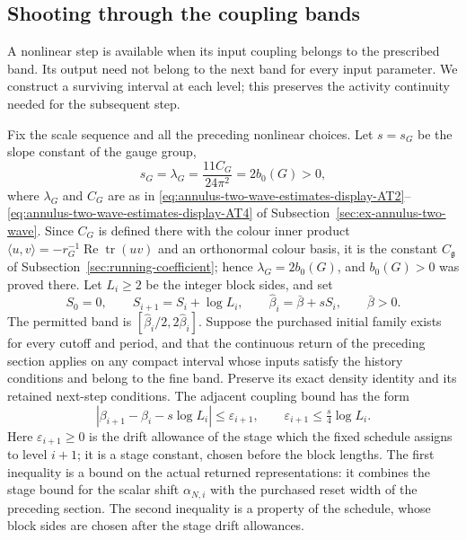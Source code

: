 \subsection{Shooting through the coupling bands}
\label{sec:surviving-interval-shooting}
A nonlinear step is available when its input coupling belongs to the
prescribed band. Its output need not belong to the next band for every
input parameter. We construct a surviving interval at each level; this
preserves the activity continuity needed for the subsequent step.

Fix the scale sequence and all the preceding nonlinear choices. Let
$s=s_G$ be the slope constant of the gauge group,
\begin{equation}\label{eq:shoot-slope}
 s_G=\lambda_G=\frac{11C_G}{24\pi^2}=2b_0(G)>0,
\end{equation}
where $\lambda_G$ and $C_G$ are as in \eqref{eq:annulus-two-wave-estimates-display-AT2}--\eqref{eq:annulus-two-wave-estimates-display-AT4} of
Subsection~\ref{sec:ex-annulus-two-wave}. Since $C_G$ is defined there with the
colour inner product $\langle u,v\rangle=-r_G^{-1}\operatorname{Re}\operatorname{tr}(uv)$
and an orthonormal colour basis, it is the constant $C_{\mathfrak g}$ of
Subsection~\ref{sec:running-coefficient}; hence $\lambda_G=2b_0(G)$, and
$b_0(G)>0$ was proved there. Let $L_i\ge2$ be the integer block sides, and set
\[
 S_0=0,\qquad S_{i+1}=S_i+\log L_i,\qquad
 \widehat\beta_i=\bar\beta+sS_i,\qquad \bar\beta>0.
\]
The permitted band is
$[\widehat\beta_i/2,2\widehat\beta_i]$.
Suppose the purchased initial family exists for every cutoff and period,
and that the continuous return of the preceding section applies on
any compact interval whose inputs satisfy the history conditions and
belong to the fine band. Preserve its exact density identity and its
retained next-step conditions. The adjacent coupling bound has the form
\begin{equation}\label{eq:shoot-adjacent-drift}
 |\beta_{i+1}-\beta_i-s\log L_i|\le\varepsilon_{i+1},
 \qquad \varepsilon_{i+1}\le\tfrac{s}{4}\log L_i.
\end{equation}
Here $\varepsilon_{i+1}\ge0$ is the drift allowance of the stage
which the fixed schedule assigns to level $i+1$; it is a stage
constant, chosen before the block lengths. The first inequality is a
bound on the actual returned representations: it combines the stage
bound for the scalar shift $\alpha_{N,i}$ with the purchased reset
width of the preceding section. The second inequality is a property
of the schedule, whose block sides are chosen after the stage drift
allowances.

